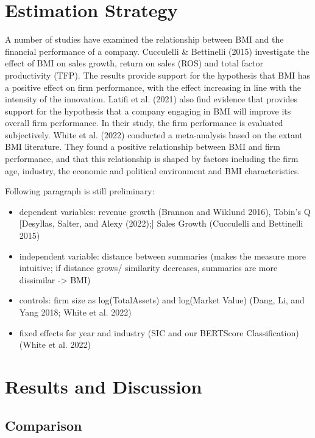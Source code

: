 \documentclass[
]{article}
\providecommand{\tightlist}{%
  \setlength{\itemsep}{0pt}\setlength{\parskip}{0pt}}\usepackage{longtable,booktabs,array}
\begin{document}
\section{Estimation Strategy}\label{estimation-strategy}

A number of studies have examined the relationship between BMI and the
financial performance of a company. Cucculelli \& Bettinelli (2015)
investigate the effect of BMI on sales growth, return on sales (ROS) and
total factor productivity (TFP). The results provide support for the
hypothesis that BMI has a positive effect on firm performance, with the
effect increasing in line with the intensity of the innovation. Latifi
et al. (2021) also find evidence that provides support for the
hypothesis that a company engaging in BMI will improve its overall firm
performance. In their study, the firm performance is evaluated
subjectively. White et al. (2022) conducted a meta-analysis based on the
extant BMI literature. They found a positive relationship between BMI
and firm performance, and that this relationship is shaped by factors
including the firm age, industry, the economic and political environment
and BMI characteristics.

Following paragraph is still preliminary:

\begin{itemize}
\tightlist
\item
  dependent variables: revenue growth (Brannon and Wiklund 2016),
  Tobin's Q {[}Desyllas, Salter, and Alexy (2022);{]} Sales Growth
  (Cucculelli and Bettinelli 2015)
\item
  independent variable: distance between summaries (makes the measure
  more intuitive; if distance grows/ similarity decreases, summaries are
  more dissimilar -\textgreater{} BMI)
\item
  controls: firm size as log(TotalAssets) and log(Market Value) (Dang,
  Li, and Yang 2018; White et al. 2022)
\item
  fixed effects for year and industry (SIC and our BERTScore
  Classification) (White et al. 2022)
\end{itemize}

\section{Results and Discussion}\label{results-and-discussion}

\subsection{Comparison}\label{comparison}
\end{document}
